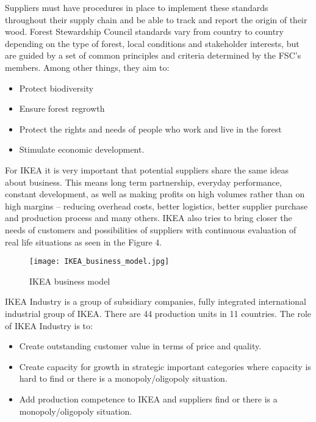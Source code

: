 \documentclass[oneside,12pt]{article}%
\begin{document}
Suppliers must have procedures in place to implement these standards throughout their supply chain and be able to track and report the origin of their wood.
Forest Stewardship Council standards vary from country to country depending on the type of forest, local conditions and stakeholder interests, but are guided by a set of common principles and criteria determined by the FSC’s members. Among other things, they aim to:

\begin{itemize}
  \item Protect biodiversity
  \item Ensure forest regrowth
  \item Protect the rights and needs of people who work and live in the forest
  \item Stimulate economic development.
\end{itemize}


For IKEA it is very important that potential suppliers share the same ideas about business. This means long term partnership, everyday performance, constant development, as well as making profits on high volumes rather than on high margins – reducing overhead costs, better logistics, better supplier purchase and production process and many others. IKEA also tries to bring closer the needs of customers and possibilities of suppliers with continuous evaluation of real life situations as seen in the Figure 4.


\begin{figure}[ht!]
  \texttt{[image: IKEA\_business\_model.jpg]}
  \caption{IKEA business model}
\end{figure}



IKEA Industry is a group of subsidiary companies, fully integrated international industrial group of IKEA. There are 44 production units in 11 countries.
The role of IKEA Industry is to:
\begin{itemize}
  \item Create outstanding customer value in terms of price and quality.
  \item Create capacity for growth in strategic important categories where capacity is hard to find or there is a monopoly/oligopoly situation.
  \item Add production competence to IKEA and suppliers find or there is a monopoly/oligopoly situation.

\end{itemize}
\end{document}
